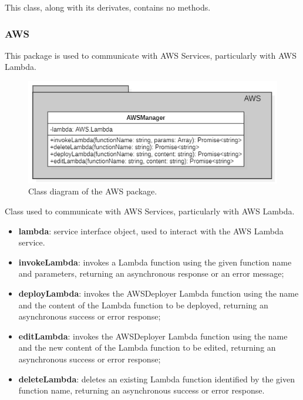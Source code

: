 	This class, along with its derivates, contains no methods.
	\subsubsection{AWS}
	This package is used to communicate with AWS Services, particularly with AWS Lambda.
	\begin{figure} [h!]
		\centering
		\includegraphics[width=0.8\linewidth]{diagrammi/etherless-server/AWS}
		\caption{Class diagram of the AWS package.}
	\end{figure}
	Class used to communicate with AWS Services, particularly with AWS Lambda.
	\begin{itemize}
		\item \textbf{lambda}: service interface object, used to interact with the AWS Lambda service.
	\end{itemize}
	\begin{itemize}
		\item \textbf{invokeLambda}: invokes a Lambda function using the given function name and parameters, returning an asynchronous response or an error message;
		\item \textbf{deployLambda}: invokes the AWSDeployer Lambda function using the name and the content of the Lambda function to be deployed, returning an asynchronous success or error response;
		\item \textbf{editLambda}: invokes the AWSDeployer Lambda function using the name and the new content of the Lambda function to be edited, returning an asynchronous success or error response;
		\item \textbf{deleteLambda}: deletes an existing Lambda function identified by the given function name, returning an asynchronous success or error response.
	\end{itemize}
